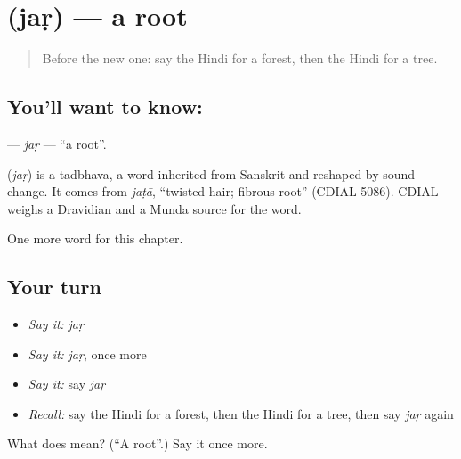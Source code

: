 \section[\texorpdfstring{\hi{जड़} (jaṛ)}{जड़ (jaṛ)}]{ (jaṛ) — a root}

\label{lesson:HI-C143-jar}



\begin{quote}
Before the new one: say the Hindi for a forest, then the Hindi for a tree.
\end{quote}

\subsection*{You'll want to know: }
\textbf{} — \emph{jaṛ} — \textquotedblleft{}a root\textquotedblright{}.

\begin{cousinweb}
\textbf{} (\emph{jaṛ}) is a tadbhava, a word inherited from Sanskrit and reshaped by sound change. It comes from \emph{jaṭā}, \textquotedblleft{}twisted hair; fibrous root\textquotedblright{} (CDIAL 5086). CDIAL weighs a Dravidian and a Munda source for the word.
\end{cousinweb}

\begin{grammarlens}[title={What you've built}]
One more word for this chapter.
\end{grammarlens}

\subsection*{Your turn}
\begin{itemize}
\raggedright
  \item \emph{Say it:} \emph{jaṛ}
  \item \emph{Say it:} \emph{jaṛ}, once more
  \item \emph{Say it:} say \emph{jaṛ}
  \item \emph{Recall:} say the Hindi for a forest, then the Hindi for a tree, then say \emph{jaṛ} again
\end{itemize}

\begin{tcolorbox}[breakable,colback=teal!4,colframe=teal!35!black,title={Before you move on}]
What does  mean? (\textquotedblleft{}A root\textquotedblright{}.) Say it once more.
\end{tcolorbox}

